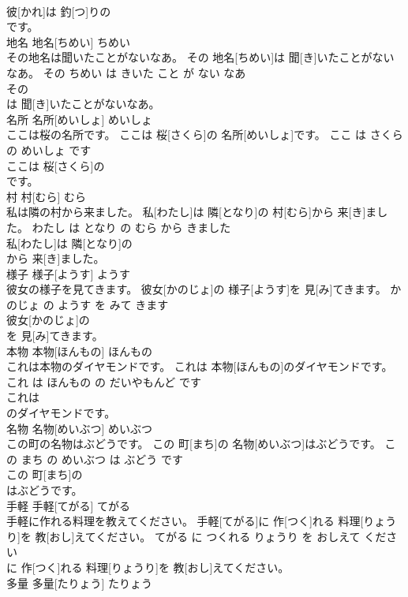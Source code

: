 \documentclass[8pt]{extreport}
\begin{document}
\begin{CJK}{UTF8}{min}
\\	彼[かれ]は 釣[つ]りの
\\	です。			
\\	地名	地名[ちめい]	ちめい	
\\	その地名は聞いたことがないなあ。	その 地名[ちめい]は 聞[き]いたことがないなあ。	その ちめい は きいた こと が ない なあ	
\\	その
\\	は 聞[き]いたことがないなあ。			
\\	名所	名所[めいしょ]	めいしょ	
\\	ここは桜の名所です。	ここは 桜[さくら]の 名所[めいしょ]です。	ここ は さくら の めいしょ です	
\\	ここは 桜[さくら]の
\\	です。			
\\	村	村[むら]	むら	
\\	私は隣の村から来ました。	私[わたし]は 隣[となり]の 村[むら]から 来[き]ました。	わたし は となり の むら から きました	
\\	私[わたし]は 隣[となり]の
\\	から 来[き]ました。			
\\	様子	様子[ようす]	ようす	
\\	彼女の様子を見てきます。	彼女[かのじょ]の 様子[ようす]を 見[み]てきます。	かのじょ の ようす を みて きます	
\\	彼女[かのじょ]の
\\	を 見[み]てきます。			
\\	本物	本物[ほんもの]	ほんもの	
\\	これは本物のダイヤモンドです。	これは 本物[ほんもの]のダイヤモンドです。	これ は ほんもの の だいやもんど です	
\\	これは
\\	のダイヤモンドです。			
\\	名物	名物[めいぶつ]	めいぶつ	
\\	この町の名物はぶどうです。	この 町[まち]の 名物[めいぶつ]はぶどうです。	この まち の めいぶつ は ぶどう です	
\\	この 町[まち]の
\\	はぶどうです。			
\\	手軽	手軽[てがる]	てがる	
\\	手軽に作れる料理を教えてください。	手軽[てがる]に 作[つく]れる 料理[りょうり]を 教[おし]えてください。	てがる に つくれる りょうり を おしえて ください	
\\	に 作[つく]れる 料理[りょうり]を 教[おし]えてください。			
\\	多量	多量[たりょう]	たりょう	

\end{CJK}
\end{document}
